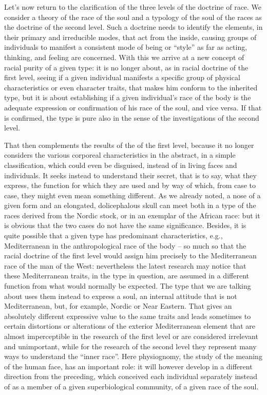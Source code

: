 Let's now return to the clarification of the three levels of the doctrine of race. We consider a theory of the race of the soul and a typology of the soul of the races as the doctrine of the second level. Such a doctrine needs to identify the elements, in their primary and irreducible modes, that act from the inside, causing groups of individuals to manifest a consistent mode of being or ``style'' as far as acting, thinking, and feeling are concerned. With this we arrive at a new concept of racial purity of a given type: it is no longer about, as in racial doctrine of the first level, seeing if a given individual manifests a specific group of physical characteristics or even character traits, that makes him conform to the inherited type, but it is about establishing if a given individual's race of the body is the adequate expression or confirmation of his race of the soul, and vice versa. If that is confirmed, the type is pure also in the sense of the investigations of the second level.

That then complements the results of the of the first level, because it no longer considers the various corporeal characteristics in the abstract, in a simple classification, which could even be disguised, instead of in living faces and individuals. It seeks instead to understand their secret, that is to say, what they express, the function for which they are used and by way of which, from case to case, they might even mean something different. As we already noted, a nose of a given form and an elongated, dolicephalous skull can meet both in a type of the races derived from the Nordic stock, or in an exemplar of the African race: but it is obvious that the two cases do not have the same significance. Besides, it is quite possible that a given type has predominant characteristics, e.g., Mediterranean in the anthropological race of the body -- so much so that the racial doctrine of the first level would assign him precisely to the Mediterranean race of the man of the West: nevertheless the latest research may notice that these Mediterranean traits, in the type in question, are assumed in a different function from what would normally be expected. The type that we are talking about uses them instead to express a soul, an internal attitude that is not Mediterranean, but, for example, Nordic or Near Eastern. That gives an absolutely different expressive value to the same traits and leads sometimes to certain distortions or alterations of the exterior Mediterranean element that are almost imperceptible in the research of the first level or are considered irrelevant and unimportant, while for the research of the second level they represent many ways to understand the ``inner race''. Here physiognomy, the study of the meaning of the human face, has an important role: it will however develop in a different direction from the preceding, which conceived each individual separately instead of as a member of a given superbiological community, of a given race of the soul.

